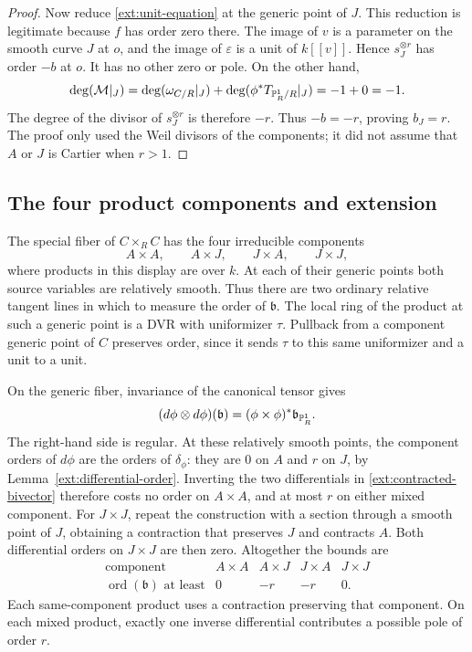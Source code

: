 \begin{proof}
Now reduce \eqref{ext:unit-equation} at the generic point of $J$.
This reduction is legitimate because $f$ has order zero there.
The image of $v$ is a parameter on the smooth curve $J$ at $o$,
and the image of $\varepsilon$ is a unit of $k[[v]]$. Hence
$s_J^{\otimes r}$ has order $-b$ at $o$. It has no other zero or
pole. On the other hand,
\[
\deg(\mathcal M|_J)
 =\deg(\omega_{C/R}|_J)
   +\deg(\phi^*T_{\mathbb P^1_R/R}|_J)=-1+0=-1.
\]
The degree of the divisor of $s_J^{\otimes r}$ is therefore $-r$.
Thus $-b=-r$, proving $b_J=r$. The proof only used the Weil
divisors of the components; it did not assume that $A$ or $J$ is
Cartier when $r>1$.
\end{proof}

\subsection{The four product components and extension}

The special fiber of $C\times_R C$ has the four irreducible
components
\[
A\times A,\qquad A\times J,\qquad
J\times A,\qquad J\times J,
\]
where products in this display are over $k$. At each of their
generic points both source variables are relatively smooth. Thus
there are two ordinary relative tangent lines in which to measure
the order of $\mathfrak b$. The local ring of the product at such
a generic point is a DVR with uniformizer $\tau$. Pullback from a
component generic point of $C$ preserves order, since it sends
$\tau$ to this same uniformizer and a unit to a unit.

On the generic fiber, invariance of the canonical tensor gives
\begin{equation}\label{ext:contracted-bivector}
(d\phi\otimes d\phi)(\mathfrak b)
  =(\phi\times\phi)^*\mathfrak b_{\mathbb P^1_R}.
\end{equation}
The right-hand side is regular. At these relatively smooth points,
the component orders of $d\phi$ are the orders of $\delta_\phi$:
they are $0$ on $A$ and $r$ on $J$, by
Lemma~\ref{ext:differential-order}. Inverting the two differentials
in \eqref{ext:contracted-bivector} therefore costs no order on
$A\times A$, and at most $r$ on either mixed component. For
$J\times J$, repeat the construction with a section through a
smooth point of $J$, obtaining a contraction that preserves $J$
and contracts $A$. Both differential orders on $J\times J$ are
then zero. Altogether the bounds are
\begin{equation}\label{ext:pole-table}
\begin{array}{c|cccc}
\text{component}&A\times A&A\times J&J\times A&J\times J\\ \hline
\operatorname{ord}(\mathfrak b)\text{ at least}
 &0&-r&-r&0.
\end{array}
\end{equation}
Each same-component product uses a contraction preserving that
component. On each mixed product, exactly one inverse differential
contributes a possible pole of order $r$.

